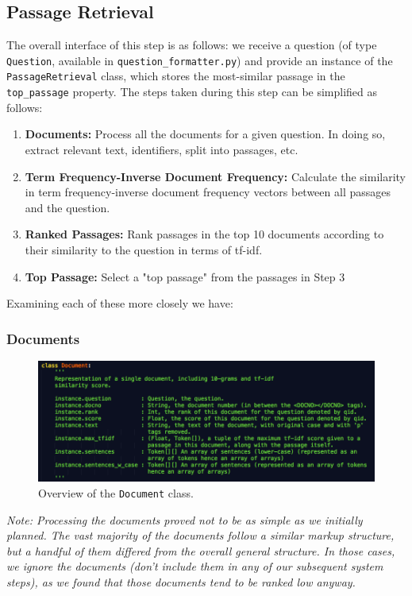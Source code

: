 \documentclass{article}
\begin{document}
\subsection{Passage Retrieval}
The overall interface of this step is as follows: we receive a question (of type \texttt{Question}, available in \texttt{question\_formatter.py}) and provide an instance of the \texttt{PassageRetrieval} class, which stores the most-similar passage in the \texttt{top\_passage} property.
The steps taken during this step can be simplified as follows:
\begin{enumerate}
\item \textbf{Documents:} Process all the documents for a given question. In doing so, extract relevant text, identifiers, split into passages, etc.
\item \textbf{Term Frequency-Inverse Document Frequency:} Calculate the similarity in term frequency-inverse document frequency vectors between all passages and the question.
\item \textbf{Ranked Passages: }Rank passages in the top 10 documents according to their similarity to the question in terms of tf-idf.
\item \textbf{Top Passage:} Select a "top passage" from the passages in Step 3
\end{enumerate}

Examining each of these more closely we have:\\
\subsubsection{Documents}
\begin{figure}[h]
    \centering
    \includegraphics[width=1.0\textwidth]{images/document.png}
    \caption{Overview of the \texttt{Document} class.}
\end{figure}
\textit{Note: Processing the documents proved not to be as simple as we initially planned. The vast majority of the documents follow a similar markup structure, but a handful of them differed from the overall general structure. In those cases, we ignore the documents (don't include them in any of our subsequent system steps), as we found that those documents tend to be ranked low anyway.}
\end{document}

